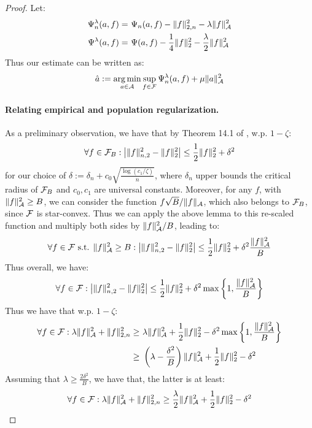 \begin{proof} 
Let:
\begin{align}
    \Psi_n^\lambda(a, f) =~& \Psi_n(a, f) - \|f\|_{2,n}^2 - \lambda \|f\|_{{\mathcal A}}^2\\
    \Psi^{\lambda}(a, f) =~& \Psi(a, f) - \frac{1}{4} \|f\|_2^2 - \frac{\lambda}{2}\|f\|_{{\mathcal A}}^2
\end{align}
Thus our estimate can be written as:
\begin{equation}
    \hat{a} := \operatorname*{arg\,min}_{a\in {\mathcal A}} \sup_{f\in {\mathcal F}} \Psi_n^{\lambda}(a, f) + \mu \|a\|_{{\mathcal A}}^2
\end{equation}


\paragraph{Relating empirical and population regularization.} 
As a preliminary observation, we have that by Theorem 14.1 of \cite{wainwright2019high}, w.p. $1-\zeta$:
\begin{equation}
    \forall f\in {\mathcal F}_{B}: \left|\|f\|_{n,2}^2 - \|f\|_2^2 \right| \leq \frac{1}{2} \|f\|_2^2 + \delta^2 
\end{equation}
for our choice of $\delta:=\delta_n + c_0 \sqrt{\frac{\log(c_1/\zeta)}{n}}$, where $\delta_n$ upper bounds the critical radius of ${\mathcal F}_{B}$ and $c_0, c_1$ are universal constants. Moreover, for any $f$, with $\|f\|_{{\mathcal A}}^2\geq B$, we can consider the function $f \sqrt{B}/\|f\|_{{\mathcal A}}$, which also belongs to ${\mathcal F}_{B}$, since ${\mathcal F}$ is star-convex. Thus we can apply the above lemma to this re-scaled function and multiply both sides by $\|f\|_{{\mathcal A}}^2/B$, leading to:
\begin{equation}
    \forall f\in {\mathcal F} \text{ s.t. } \|f\|_{{\mathcal A}}^2 \geq B: \left|\|f\|_{n,2}^2 - \|f\|_2^2 \right| \leq \frac{1}{2} \|f\|_2^2 + \delta^2\frac{\|f\|_{{\mathcal A}}^2}{B}
\end{equation}
Thus overall, we have:
\begin{equation}\label{eqn:reg-pop-emp}
    \forall f\in {\mathcal F}: \left|\|f\|_{n,2}^2 - \|f\|_2^2 \right| \leq \frac{1}{2} \|f\|_2^2 + \delta^2 \max\left\{1, \frac{\|f\|_{{\mathcal A}}^2}{B}\right\}
\end{equation}
Thus we have that w.p. $1-\zeta$: 
\begin{align}
    \forall f\in {\mathcal F}: \lambda \|f\|_{{\mathcal A}}^2 + \|f\|_{2,n}^2 \geq~& \lambda \|f\|_{{\mathcal A}}^2 + \frac{1}{2}\|f\|_{2}^2 - \delta^2 \max\left\{1, \frac{\|f\|_{{\mathcal A}}^2}{B}\right\}\\
    \geq~& \left(\lambda - \frac{\delta^2}{B}\right)\|f\|_{{\mathcal A}}^2 + \frac{1}{2}\|f\|_{2}^2 - \delta^2
\end{align}
Assuming that $\lambda \geq \frac{2\delta^2}{B}$, we have that, the latter is at least:
\begin{equation}
    \forall f\in {\mathcal F}: \lambda \|f\|_{{\mathcal A}}^2 + \|f\|_{2,n}^2 \geq \frac{\lambda}{2} \|f\|_{{\mathcal A}}^2 + \frac{1}{2}\|f\|_{2}^2 - \delta^2
\end{equation}



\end{proof}
